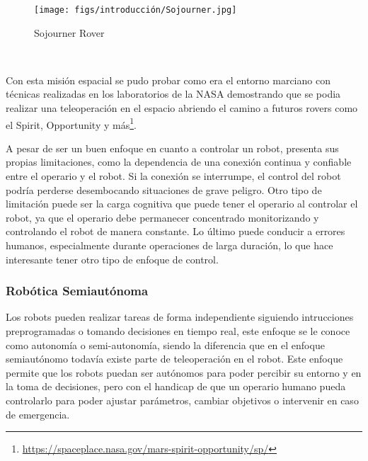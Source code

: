 \begin{figure} [H]
  \begin{center}
    \texttt{[image: figs/introducción/Sojourner.jpg]}
  \end{center}
  \caption{Sojourner Rover}
  \label{fig:Sojourner}
\end{figure}\

Con esta misión espacial se pudo probar como era el entorno marciano con técnicas realizadas en los laboratorios de la NASA demostrando que se podia realizar una teleoperación en 
el espacio abriendo el camino a futuros rovers como el Spirit, Opportunity y más\footnote{\url{https://spaceplace.nasa.gov/mars-spirit-opportunity/sp/}}. \newline

A pesar de ser un buen enfoque en cuanto a controlar un robot, presenta sus propias limitaciones, como la dependencia de una conexión continua y confiable entre
el operario y el robot. Si la conexión se interrumpe, el control del robot podría perderse desembocando situaciones de grave peligro. Otro tipo de limitación puede ser la carga
cognitiva que puede tener el operario al controlar el robot, ya que el operario debe permanecer concentrado monitorizando y controlando el robot de manera constante.
Lo último puede conducir a errores humanos, especialmente durante operaciones de larga duración, lo que hace interesante tener otro tipo de enfoque de control.

\subsubsection{Robótica Semiautónoma}
\label{sec:subseccion}
Los robots pueden realizar tareas de forma independiente siguiendo intrucciones preprogramadas o tomando decisiones en tiempo real, este enfoque se le conoce como autonomía o semi-autonomía, 
siendo la diferencia que en el enfoque semiautónomo todavía existe parte de teleoperación en el robot. Este enfoque permite que los robots puedan ser autónomos para poder
percibir su entorno y en la toma de decisiones, pero con el handicap de que un operario humano pueda controlarlo para poder ajustar parámetros, cambiar objetivos o intervenir 
en caso de emergencia. \newline

